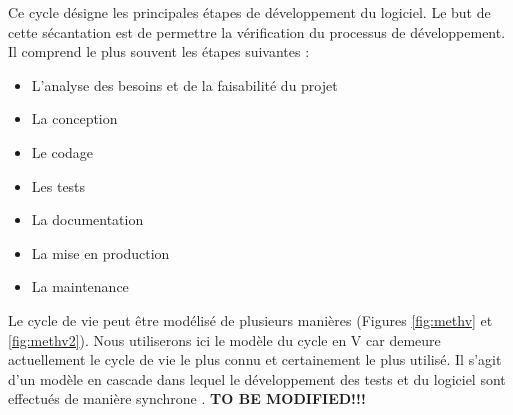 Ce cycle désigne les principales étapes de développement du logiciel.
Le but de cette sécantation est de permettre la vérification du processus de développement.
Il comprend le plus souvent les étapes suivantes :
\begin{itemize}
        \item L'analyse des besoins et de la faisabilité du projet
        \item La conception
        \item Le codage
        \item Les tests
        \item La documentation
        \item La mise en production
        \item La maintenance
\end{itemize}
Le cycle de vie peut être modélisé de plusieurs manières (Figures \ref{fig:methv}  et \ref{fig:methv2}).
Nous utiliserons ici le modèle du cycle en V car demeure actuellement le cycle de vie le 
plus connu et certainement le plus utilisé. 
Il s'agit d'un modèle en cascade dans lequel le 
développement des tests et du logiciel sont effectués 
de manière synchrone \cite{audibert2009uml}. \textbf{TO BE MODIFIED!!!}

